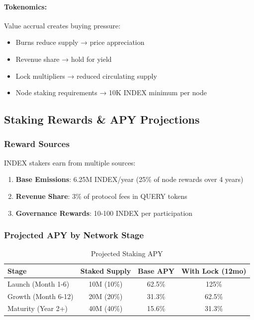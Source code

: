 \documentclass[12pt,a4paper]{article}
\begin{document}
\paragraph{Tokenomics:} Value accrual creates buying pressure:
\begin{itemize}
    \item Burns reduce supply → price appreciation
    \item Revenue share → hold for yield
    \item Lock multipliers → reduced circulating supply
    \item Node staking requirements → 10K INDEX minimum per node
\end{itemize}

\subsection{Staking Rewards \& APY Projections}

\subsubsection{Reward Sources}
INDEX stakers earn from multiple sources:
\begin{enumerate}
    \item \textbf{Base Emissions}: 6.25M INDEX/year (25\% of node rewards over 4 years)
    \item \textbf{Revenue Share}: 3\% of protocol fees in QUERY tokens
    \item \textbf{Governance Rewards}: 10-100 INDEX per participation
\end{enumerate}

\subsubsection{Projected APY by Network Stage}

\begin{table}[h]
\centering
\begin{tabular}{lccc}
\toprule
\textbf{Stage} & \textbf{Staked Supply} & \textbf{Base APY} & \textbf{With Lock (12mo)} \\
\midrule
Launch (Month 1-6) & 10M (10\%) & 62.5\% & 125\% \\
Growth (Month 6-12) & 20M (20\%) & 31.3\% & 62.5\% \\
Maturity (Year 2+) & 40M (40\%) & 15.6\% & 31.3\% \\
\bottomrule
\end{tabular}
\caption{Projected Staking APY}
\end{table}
\end{document}
